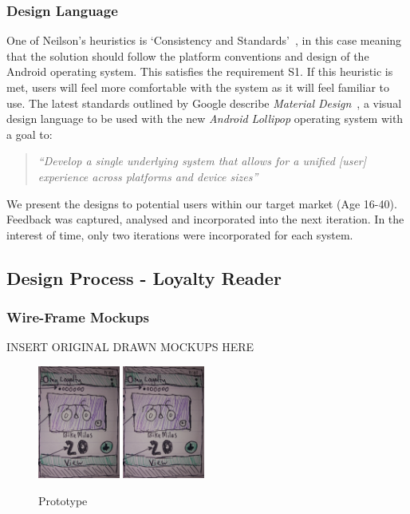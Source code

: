 \subsubsection{Design Language}
One of Neilson's heuristics is `Consistency and Standards'~\cite{jakob}, in this case meaning that the solution should follow the platform conventions and design of the Android operating system. This satisfies the requirement S1. If this heuristic is met, users will feel more comfortable with the system as it will feel familiar to use. The latest standards outlined by Google describe \emph{Material Design}~\cite{materialDesign}, a visual design language to be used with the new \emph{Android Lollipop} operating system with a goal to:
\begin{quote}
    \textit{``Develop a single underlying system that allows for a unified [user] experience across platforms and device sizes''}~\cite[Introduction]{materialDesign}
\end{quote}

We present the designs to potential users within our target market (Age 16-40). Feedback was captured, analysed and incorporated into the next iteration. In the interest of time, only two iterations were incorporated for each system.

\subsection{Design Process - Loyalty Reader}

\subsubsection{Wire-Frame Mockups}
INSERT ORIGINAL DRAWN MOCKUPS HERE
\begin{figure}[H]
 \centering
  \includegraphics[width=0.24\textwidth]{img/wireframeMockup.png}
   \includegraphics[width=0.24\textwidth]{img/wireframeMockup.png}
    \caption{Prototype}
\end{figure}

